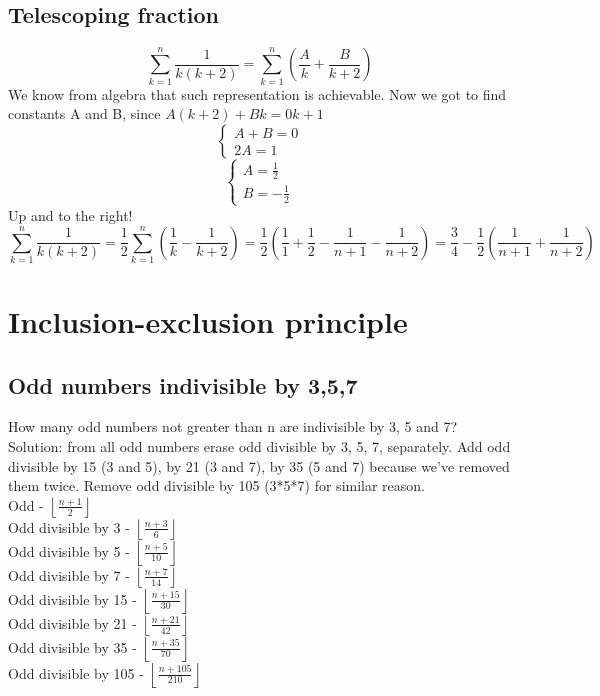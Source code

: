 \documentclass[12pt]{article}
\begin{document}
\subsection{Telescoping fraction}
\[\sum_{k=1}^{n} \frac{1}{k(k+2)} = \sum_{k=1}^{n} (\frac{A}{k} + \frac{B}{k+2})\]
We know from algebra that such representation is achievable. Now we got to find constants A and B, since $A(k+2) + Bk = 0k + 1$
\[
\begin{cases}
A + B = 0\\2A=1
\end{cases}\]
\[
\begin{cases}
A=\frac{1}{2}\\B=-\frac{1}{2}
\end{cases}\]
Up and to the right!
\[
\sum_{k=1}^{n} \frac{1}{k(k+2)} = \frac{1}{2} \sum_{k=1}^{n} (\frac{1}{k} - \frac{1}{k+2}) =
\frac{1}{2} (\frac{1}{1} + \frac{1}{2} - \frac{1}{n+1} - \frac{1}{n+2}) =
\frac{3}{4} - \frac{1}{2} (\frac{1}{n+1} + \frac{1}{n+2})
\]

\section{Inclusion-exclusion principle}
\subsection{Odd numbers indivisible by 3,5,7}
How many odd numbers not greater than n are indivisible by 3, 5 and 7?\\
Solution: from all odd numbers erase odd divisible by 3, 5, 7, separately. Add odd divisible by 15 (3 and 5), by 21 (3 and 7), by 35 (5 and 7) because we've removed them twice. Remove odd divisible by 105 (3*5*7) for similar reason.\\
Odd - $\left \lfloor{\frac{n+1}{2}}\right \rfloor$\\
Odd divisible by 3 - $\left \lfloor{\frac{n+3}{6}}\right \rfloor$\\
Odd divisible by 5 - $\left \lfloor{\frac{n+5}{10}}\right \rfloor$\\
Odd divisible by 7 - $\left \lfloor{\frac{n+7}{14}}\right \rfloor$\\
Odd divisible by 15 - $\left \lfloor{\frac{n+15}{30}}\right \rfloor$\\
Odd divisible by 21 - $\left \lfloor{\frac{n+21}{42}}\right \rfloor$\\
Odd divisible by 35 - $\left \lfloor{\frac{n+35}{70}}\right \rfloor$\\
Odd divisible by 105 - $\left \lfloor{\frac{n+105}{210}}\right \rfloor$\\
\end{document}
